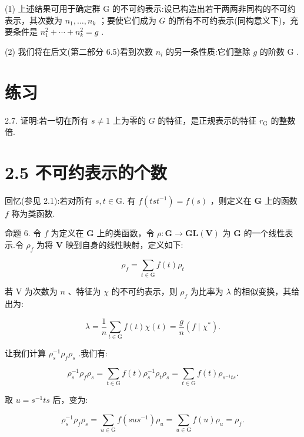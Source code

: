 (1) 上述结果可用于确定群 G 的不可约表示:设已构造出若干两两非同构的不可约表示，其次数为 \({n}_{1},\ldots ,{n}_{k}\) ；要使它们成为 \(G\) 的所有不可约表示(同构意义下)，充要条件是 \({n}_{1}^{2} + \cdots  + {n}_{k}^{2} = g\) .

(2) 我们将在后文(第二部分 6.5)看到次数 \({n}_{i}\) 的另一条性质:它们整除 \(g\) 的阶数 \(\mathrm{G}\) .

\section*{练习}

2.7. 证明:若一切在所有 \(s \neq  1\) 上为零的 \(G\) 的特征，是正规表示的特征 \({r}_{\mathrm{G}}\) 的整数倍.

\section*{2.5 不可约表示的个数}

回忆(参见 2.1):若对所有 \(s,t \in  \mathrm{G}.\) 有 \(f\left( {{ts}{t}^{-1}}\right)  = f\left( s\right)\) ，则定义在 \(\mathbf{G}\) 上的函数 \(f\) 称为类函数.

命题 6. 令 \(f\) 为定义在 \(\mathbf{G}\) 上的类函数，令 \(\rho  : \mathbf{G} \rightarrow  \mathbf{{GL}}\left( \mathbf{V}\right)\) 为 \(\mathbf{G}\) 的一个线性表示.令 \({\rho }_{f}\) 为将 \(\mathbf{V}\) 映到自身的线性映射，定义如下:

\[
{\rho }_{f} = \mathop{\sum }\limits_{{t \in  \mathrm{G}}}f\left( t\right) {\rho }_{t}
\]

若 \(\mathrm{V}\) 为次数为 \(n\) 、特征为 \(\chi\) 的不可约表示，则 \({\rho }_{f}\) 为比率为 \(\lambda\) 的相似变换，其给出为:

\[
\lambda  = \frac{1}{n}\mathop{\sum }\limits_{{t \in  \mathrm{G}}}f\left( t\right) \chi \left( t\right)  = \frac{g}{n}\left( {f \mid  {\chi }^{ * }}\right) .
\]

让我们计算 \({\rho }_{s}^{-1}{\rho }_{f}{\rho }_{s}\) .我们有:

\[
{\rho }_{s}^{-1}{\rho }_{f}{\rho }_{s} = \mathop{\sum }\limits_{{t \in  \mathrm{G}}}f\left( t\right) {\rho }_{s}^{-1}{\rho }_{t}{\rho }_{s} = \mathop{\sum }\limits_{{t \in  \mathrm{G}}}f\left( t\right) {\rho }_{{s}^{-1}{ts}}.
\]

取 \(u = {s}^{-1}{ts}\) 后，变为:

\[
{\rho }_{s}^{-1}{\rho }_{f}{\rho }_{s} = \mathop{\sum }\limits_{{u \in  \mathrm{G}}}f\left( {{su}{s}^{-1}}\right) {\rho }_{u} = \mathop{\sum }\limits_{{u \in  \mathrm{G}}}f\left( u\right) {\rho }_{u} = {\rho }_{f}.
\]

